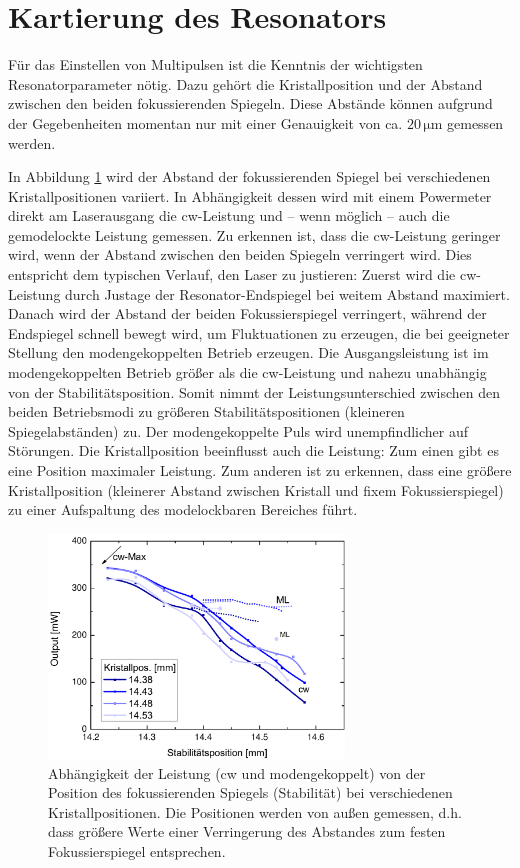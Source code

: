 \documentclass[bachelor,       %
               twoside,        %
               BCOR10mm,       %
               liststotoc,nomtotoc,bibtotoc, %
               english,ngerman, %
               final,          %
               ]{GAUBM}
\begin{document}
\section{Kartierung des Resonators}
Für das Einstellen von Multipulsen ist die Kenntnis der wichtigsten Resonatorparameter nötig.
Dazu gehört die Kristallposition und der Abstand zwischen den beiden fokussierenden Spiegeln.
Diese Abstände können aufgrund der Gegebenheiten momentan nur mit einer Genauigkeit von ca. $20\,\si{\micro\meter}$ gemessen werden.

In Abbildung \ref{fig:map} wird der Abstand der fokussierenden Spiegel bei verschiedenen Kristallpositionen variiert.
In Abhängigkeit dessen wird mit einem Powermeter direkt am Laserausgang die cw-Leistung und -- wenn möglich -- auch die gemodelockte Leistung gemessen.
Zu erkennen ist, dass die cw-Leistung geringer wird, wenn der Abstand zwischen den beiden Spiegeln verringert wird.
Dies entspricht dem typischen Verlauf, den Laser zu justieren:
Zuerst wird die cw-Leistung durch Justage der Resonator-Endspiegel bei weitem Abstand maximiert.
Danach wird der Abstand der beiden Fokussierspiegel verringert, während der Endspiegel schnell bewegt wird, um Fluktuationen zu erzeugen, die bei geeigneter Stellung den modengekoppelten Betrieb erzeugen.
Die Ausgangsleistung ist im modengekoppelten Betrieb größer als die cw-Leistung und nahezu unabhängig von der Stabilitätsposition.
Somit nimmt der Leistungsunterschied zwischen den beiden Betriebsmodi zu größeren Stabilitätspositionen (kleineren Spiegelabständen) zu.
Der modengekoppelte Puls wird unempfindlicher auf Störungen.
Die Kristallposition beeinflusst auch die Leistung: Zum einen gibt es eine Position maximaler Leistung.
Zum anderen ist zu erkennen, dass eine größere Kristallposition (kleinerer Abstand zwischen Kristall und fixem Fokussierspiegel) zu einer Aufspaltung des modelockbaren Bereiches führt.

\begin{figure}[!htb]
	\centering
	\includegraphics[width=0.7\textwidth]{figures/map.pdf}
	\caption{Abhängigkeit der Leistung (cw und modengekoppelt) von der Position des fokussierenden Spiegels (Stabilität) bei verschiedenen Kristallpositionen.
	Die Positionen werden von außen gemessen, d.h. dass größere Werte einer Verringerung des Abstandes zum festen Fokussierspiegel entsprechen.}
	\label{fig:map}
\end{figure}
\end{document}
